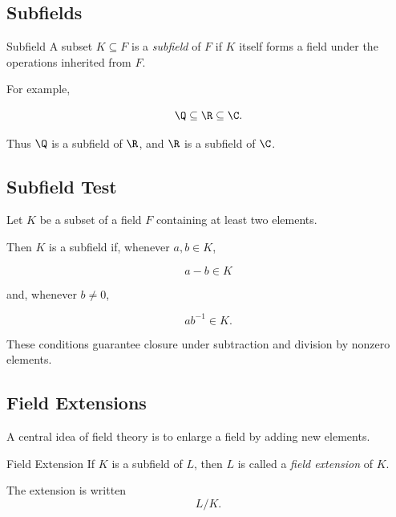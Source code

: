 \subsection{Subfields}
\label{subsec:subfields}

\begin{definitionbox}{Subfield}
A subset \(K\subseteq F\) is a \emph{subfield} of \(F\) if \(K\) itself forms
a field under the operations inherited from \(F\).
\end{definitionbox}

For example,

\[ \Q\subseteq\R\subseteq\C. \]

Thus \(\Q\) is a subfield of \(\R\), and \(\R\) is a subfield of \(\C\).

\subsection{Subfield Test}
\label{subsec:subfield-test}

\begin{theorem}
Let \(K\) be a subset of a field \(F\) containing at least two elements.

Then \(K\) is a subfield if, whenever \(a,b\in K\),

\[ a-b\in K \]

and, whenever \(b\neq0\),

\[ ab^{-1}\in K. \]
\end{theorem}

These conditions guarantee closure under subtraction and division by nonzero
elements.

\subsection{Field Extensions}
\label{subsec:field-extensions}

A central idea of field theory is to enlarge a field by adding new elements.

\begin{definitionbox}{Field Extension}
If \(K\) is a subfield of \(L\), then \(L\) is called a \emph{field
extension} of \(K\).

The extension is written
\[ L/K. \]
\end{definitionbox}

